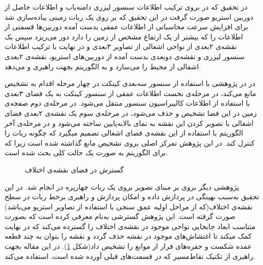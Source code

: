 در تحقیق که در  بروی ترکیب اطلاعات سنسور لیزری دامنه‌یاب و اطلاعات حاصل از دوربین استریو صورت گرفت در این تحقیق که بر روی یک ربات زمینی پیاده‌سازی شد برای افزایش سرعت محاسباتی از اطلاعات عمقی بدست آمده دوربین‌ها قسمتی از اطلاعات را که بیشتر از یک ارتفاع مشخص از زمین را دارد دور می‌ریزد سپس یک نقشه‌ی ۲بعدی از نواحی اشغالی از تصاویر ۳بعدی و در نهایت با ترکیب اطلاعات سنسور لیزری و نقشه‌ی دوبعدی بدست آمده از دوربین‌های استریو، نقشه‌ی ۲بعدی اشفالی از محیط را می‌سازد و به الگوریتم  بجهت راهبری و  می‌دهد.

در  در پژوهشی با استفاده از سنسور سه‌بعدی کینکت در چهار مرحله اقدام به تشخیص مانع می‌کند، در مرحله‌ی نخست اطلاعات عمقی از سنسور کینکت به یک فضای ۳بعدی با استفاده از اطلاعات کالیبراسیون سنسور منتقل می‌شود. در مرحله‌ی دوم صفحه‌ی زمین در این فضا تشخیص و حذف می‌شود، در مرحله‌ی سوم یک نقشه‌ی ۲بعدی فضای اشغالی با تصویر کردن این نقشه به نمای بالابه‌پایین ساخته می‌شود و در مرحله‌ی آخر الگوریتم  با استفاده از این نقشه‌ی فضای اشغالی تصمیم میگیرد که چگونه ربات را کنترل کند. در این پژوهش تمرکز اصلی بروی تشخیص مانع گذاشته شده است زیرا که برای الگوریتم  به صورت یک حالت کلی بحث شده است.

\begin{figure}[b]
\centering
{}
\caption{گسترش
در فضای نقشه‌ی اختلاف}
\label{fig:c_space_expansion}
\end{figure}

پژوهشی دیگر بروی  بر مبنای تصویر بروی یک ربات چهارپره در  انجام شد. در این تحقیق  به‌سبب بهینگی در پردازش داده و امکان پردازش و راهبری برخط ربات در سطح نقشه‌ی اختلاف(که از مراحل اولیه عمق سنجی با استفاده از تصاویر استریو می‌باشد) صورت گرفته است. این پژوهش گسترشی به‌نام  معرفی کرده است که بصورت متناسب ابعاد جابجایی نواحی موجود در نقشه‌ی اختلاف را گسترده می‌کند که در نهایت کمک میکند تا اغتشاش‌های موجود در نقشه حذف گردد و نقشه را بتوان به چند قطعه عمده شکست و حفره‌های فرار از موانع را تشخیص داد(شکل \ref{fig:c_space_expansion}). در این مقاله بجهت راهبری از تکنیک نقاط‌مسیر که در قسمت‌های قبلی آورده شده است، استفاده می‌کند.

